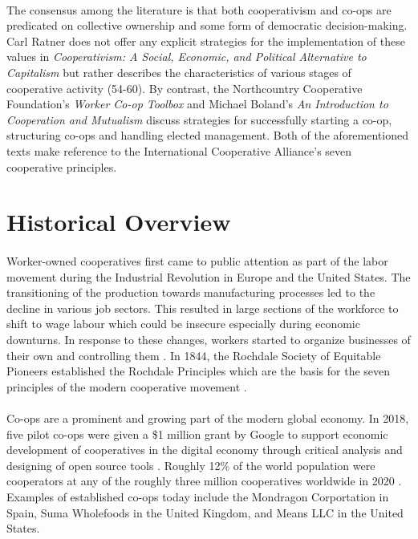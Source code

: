 \paragraph{} The consensus among the literature is that both cooperativism and co-ops are predicated on collective ownership and some form of democratic decision-making. Carl Ratner does not offer any explicit strategies for the implementation of these values in \textit{Cooperativism: A Social, Economic, and Political Alternative to Capitalism} but rather describes the characteristics of various stages of cooperative activity (54-60). By contrast, the Northcountry Cooperative Foundation's \textit{Worker Co-op Toolbox} and Michael Boland's \textit{An Introduction to Cooperation and Mutualism} discuss strategies for successfully starting a co-op, structuring co-ops and handling elected management. Both of the aforementioned texts make reference to the International Cooperative Alliance's seven cooperative principles.

\section{Historical Overview}

\paragraph{} Worker-owned cooperatives first came to public attention as part of the labor movement during the Industrial Revolution in Europe and the United States. The transitioning of the production towards manufacturing processes led to the decline in various job sectors. This resulted in large sections of the workforce to shift to wage labour which could be insecure especially during economic downturns. In response to these changes, workers started to organize businesses of their own and controlling them \autocite{adams_putting_1992}. In 1844, the Rochdale Society of Equitable Pioneers established the Rochdale Principles which are the basis for the seven principles of the modern cooperative movement \autocite{thompson_co-op_1994}.

\paragraph{} Co-ops are a prominent and growing part of the modern global economy. In 2018, five pilot co-ops were given a \$1 million grant by Google to support economic development of cooperatives in the digital economy through critical analysis and designing of open source tools \autocite{the_new_school_trebor_2018}. Roughly 12\% of the world population were cooperators at any of the roughly three million cooperatives worldwide in 2020 \autocite{world_cooperative_monitor_exploring_2020}. Examples of established co-ops today include the Mondragon Corportation in Spain, Suma Wholefoods in the United Kingdom, and Means LLC in the United States.

